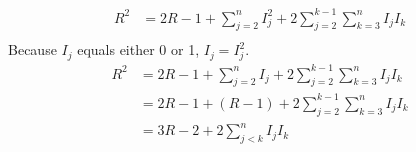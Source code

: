 \documentclass[a4paper,12pt]{article}
\begin{document}
\begin{equation*}
\begin{aligned}
R^2& = 2 R - 1 + \sum _ { j = 2 } ^ { n } I _ { j } ^ { 2 } + 2 \sum _ { j =2 } ^ { k-1 } \sum_{k=3}^{n} I _ { j } I _ { k }  \\
\end{aligned}
\end{equation*}
Because $I_j$ equals either 0 or 1, $I_j=I_j^2$.\\
\begin{equation*}
\begin{aligned}
R^2 &= 2 R - 1 + \sum _ { j = 2 } ^ { n } I _ { j } + 2 \sum _ { j=2 } ^ { k - 1 } \sum_{k=3}^{n} I _ { j } I _ { k } \\
 &= 2 R - 1 + ( R - 1 ) + 2 \sum _ { j=2 } ^ { k - 1 } \sum_{k=3}^{n} I _ { j } I _ { k }  \\
  &= 3 R - 2 + 2\sum _ { j < k } ^ {n } I _ { j } I _ { k }
\end{aligned}
\end{equation*}
\end{document}
